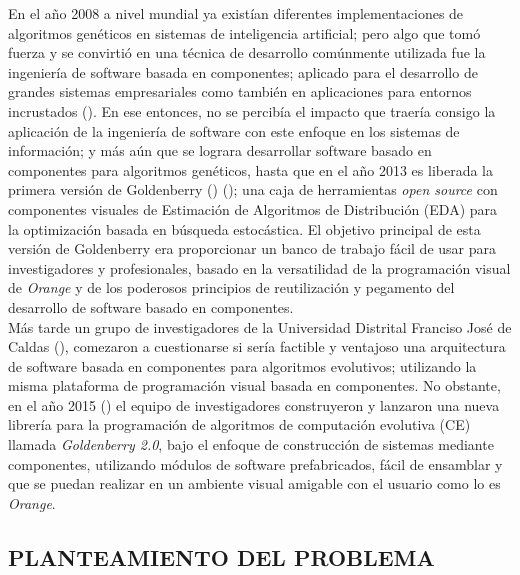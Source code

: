 En el año 2008 a nivel mundial ya existían diferentes implementaciones de algoritmos genéticos en sistemas de inteligencia artificial; pero algo que tomó fuerza y se convirtió en una técnica de desarrollo comúnmente utilizada fue la ingeniería de software basada en componentes; aplicado para el desarrollo de grandes sistemas empresariales como también en aplicaciones para entornos incrustados (\cite{Adamek2008}). En ese entonces, no se percibía el impacto que traería consigo la aplicación de la ingeniería de software con este enfoque en los sistemas de información; y más aún que se lograra desarrollar software basado en componentes para algoritmos genéticos, hasta que en el año 2013 es liberada la primera versión de Goldenberry (\cite{Rojas-Galeano2013}) (\cite{NestorTesis2013}); una caja de herramientas \textit{open source} con componentes visuales de Estimación de Algoritmos de Distribución (EDA) para la optimización basada en búsqueda estocástica.  El objetivo principal de esta versión de Goldenberry era proporcionar un banco de trabajo fácil de usar para investigadores y profesionales, basado en la versatilidad de la programación visual de \textit{Orange} y de los poderosos principios de reutilización y pegamento del desarrollo de software basado en componentes.\\   

Más tarde un grupo de investigadores de la Universidad Distrital Franciso José de Caldas (\cite{LeidyTowars}), comezaron a cuestionarse si sería factible y ventajoso una arquitectura de software basada en componentes para algoritmos evolutivos; utilizando la misma plataforma de programación visual basada en componentes.  No obstante, en el año 2015 (\cite{LeidyVisual}) el equipo de investigadores construyeron y lanzaron una nueva librería para la programación de algoritmos de computación evolutiva (CE) llamada \textit{Goldenberry 2.0}, bajo el enfoque de construcción de sistemas mediante componentes, utilizando módulos de software prefabricados, fácil de ensamblar y que se puedan realizar en un ambiente visual amigable con el usuario como lo es \textit{Orange}.\\

\subsection{PLANTEAMIENTO  DEL PROBLEMA}

